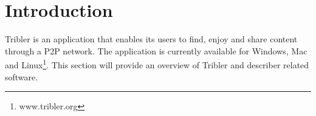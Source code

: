 \section{Introduction}
Tribler is an application that enables its users to find, enjoy and share content through a P2P network. The application is currently available for Windows, Mac and Linux\footnote{www.tribler.org}. This section will provide an overview of Tribler and describer related software.
